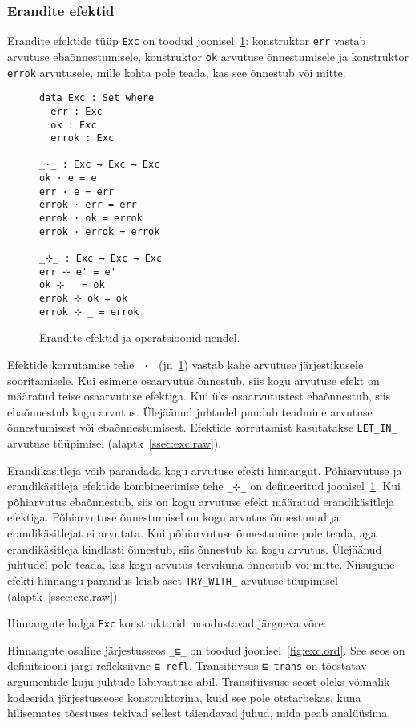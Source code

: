 \documentclass[a4paper,12pt]{article}
\begin{document}
\subsubsection{Erandite efektid}\label{sssec:exc.exc}

Erandite efektide tüüp {\tt Exc} on toodud joonisel~\ref{fig:exc.exc}:
konstruktor {\tt err} vastab arvutuse ebaõnnestumisele,
konstruktor {\tt ok} arvutuse õnnestumisele ja konstruktor {\tt errok} arvutusele,
mille kohta pole teada, kas see õnnestub või mitte.

\begin{figure}
  \begin{BVerbatim}
data Exc : Set where
  err : Exc
  ok : Exc
  errok : Exc

_·_ : Exc → Exc → Exc
ok · e = e
err · e = err
errok · err = err
errok · ok = errok
errok · errok = errok

_⊹_ : Exc → Exc → Exc
err ⊹ e' = e'
ok ⊹ _ = ok
errok ⊹ ok = ok
errok ⊹ _ = errok
  \end{BVerbatim}
  \caption{Erandite efektid ja operatsioonid nendel.}
  \label{fig:exc.exc}
\end{figure}

Efektide korrutamise tehe {\tt _·_} (jn~\ref{fig:exc.exc}) vastab kahe arvutuse järjestikusele sooritamisele.
Kui esimene osaarvutus õnnestub, siis kogu arvutuse efekt on määratud teise osaarvutuse efektiga.
Kui üks osaarvutustest ebaõnnestub, siis ebaõnnestub kogu arvutus.
Ülejäänud juhtudel puudub teadmine arvutuse õnnestumisest või ebaõnnestumisest.
Efektide korrutamist kasutatakse {\tt LET_IN_} arvutuse tüüpimisel (alaptk~\ref{ssec:exc.raw}).

Erandikäsitleja võib parandada kogu arvutuse efekti hinnangut.
Põhiarvutuse ja erandikäsitleja efektide kombineerimise tehe {\tt _⊹_} on defineeritud joonisel~\ref{fig:exc.exc}.
Kui põhiarvutus ebaõnnestub, siis on kogu arvutuse efekt määratud erandikäsitleja efektiga.
Põhiarvutuse õnnestumisel on kogu arvutus õnnestunud ja erandikäsitlejat ei arvutata.
Kui põhiarvutuse õnnestumine pole teada, aga erandikäsitleja kindlasti õnnestub, siis õnnestub ka kogu arvutus.
Ülejäänud juhtudel pole teada, kas kogu arvutus tervikuna õnnestub või mitte.
Niisugune efekti hinnangu parandus leiab aset {\tt TRY_WITH_} arvutuse tüüpimisel (alaptk~\ref{ssec:exc.raw}).

Hinnangute hulga {\tt Exc} konstruktorid moodustavad järgneva võre:
\begin{center}
\end{center}
Hinnangute osaline järjestusseos {\tt _⊑_} on toodud joonisel~\ref{fig:exc.ord}.
See seos on definitsiooni järgi refleksiivne {\tt ⊑-refl}.
Transitiivsus {\tt ⊑-trans} on tõestatav argumentide kuju juhtude läbivaatuse abil.
Transitiivsuse seost oleks võimalik kodeerida järjestusseose konstruktorina, kuid see pole otstarbekas,
kuna hilisemates tõestuses tekivad sellest täiendavad juhud, mida peab analüüsima.
\end{document}
